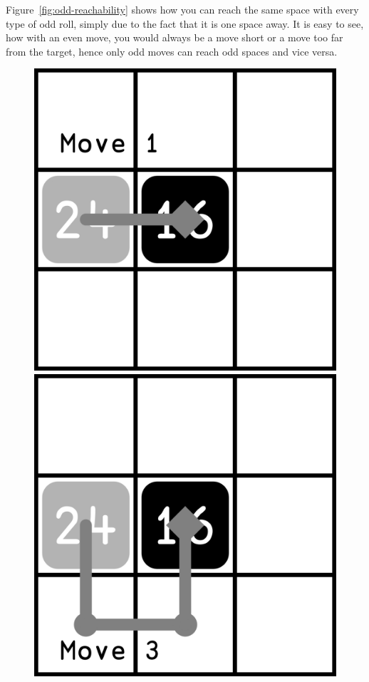 Figure~\ref{fig:odd-reachability} shows how you can reach the same space with every type of odd roll, simply due to the fact that it is one space away. It is easy to see, how with an even move, you would always be a move short or a move too far from the target, hence only odd moves can reach odd spaces and vice versa.
\begin{figure}
    \centering
    \begin{minipage}{0.3\textwidth}
        \includegraphics[width=\textwidth]{../graphics/move-1}
    \end{minipage}
    \begin{minipage}{0.3\textwidth}
        \includegraphics[width=\textwidth]{../graphics/move-3}

\end{minipage}
\end{figure}
